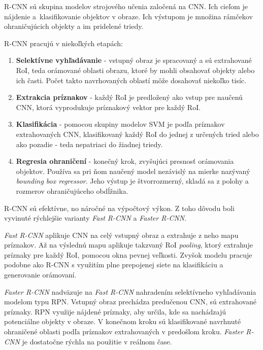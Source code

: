         \ac{R-CNN} sú skupina modelov strojového učenia zaločená na \ac{CNN}. Ich cieľom je nájdenie a~klasifikovanie objektov v obraze. Ich výstupom je množina rámčekov ohraničujúcich objekty a im pridelené triedy.

        \ac{R-CNN} pracujú v niekoľkých etapách:
        \begin{enumerate}
            \item \textbf{Selektívne vyhľadávanie} - vstupný obraz je spracovaný a sú extrahované \ac{RoI}, teda orámované oblasti obrazu, ktoré by mohli obsahovať objekty alebo ich časti. Počet takto navrhovaných oblastí môže dosahovať niekoľko tisíc.
            \item \textbf{Extrakcia príznakov} - každý \ac{RoI} je predložený ako vstup pre naučenú \ac{CNN}, ktorá vyprodukuje príznakový vektor pre každý \ac{RoI}.
            \item \textbf{Klasifikácia} - pomocou skupiny modelov \ac{SVM} je podľa príznakov extrahovaných \ac{CNN}, klasifikovaný každý \ac{RoI} do jednej z určených tried alebo ako pozadie - teda nepatriaci do žiadnej triedy.
            \item \textbf{Regresia ohraničení} - konečný krok, zvyšujúci presnosť orámovania objektov. Používa sa pri ňom naučený model nezávislý na mierke nazývaný \emph{bounding box regressor}. Jeho výstup je štvorrozmerný, skladá sa z polohy a rozmerov ohraničujúceho obdĺžnika.
        \end{enumerate}

        \ac{R-CNN} sú efektívne, no náročné na výpočtový výkon. Z toho dôvodu boli vyvinuté rýchlejšie varianty \emph{Fast R-CNN} a \emph{Faster R-CNN}.

        \emph{Fast R-CNN} aplikuje \ac{CNN} na celý vstupný obraz a extrahuje z neho mapu príznakov. Až na výslednú mapu aplikuje takzvaný \ac{RoI} \emph{pooling}, ktorý extrahuje príznaky pre každý \ac{RoI}, pomocou okna pevnej veľkosti. Zvyšok modelu pracuje podobne ako \ac{R-CNN} s využitím plne prepojenej siete na klasifikáciu a generovanie orámovaní.

        \emph{Faster R-CNN} nadväzuje na \emph{Fast R-CNN} nahradením selektívneho vyhľadávania modelom typu \ac{RPN}. Vstupný obraz prechádza predučenou \ac{CNN}, sú extrahované príznaky. \ac{RPN} využije nájdené príznaky, aby určila, kde sa nachádzajú potenciálne objekty v obraze. V konečnom kroku sú klasifikované navrhnuté ohraničené oblasti podľa príznakov extrahovaných v predošlom kroku. \emph{Faster R-CNN} je dostatočne rýchla na použitie v reálnom čase.

